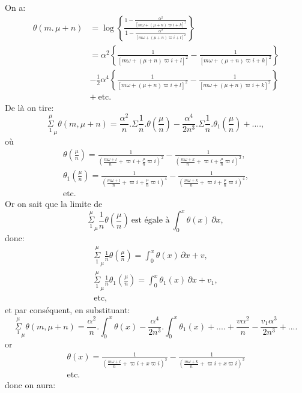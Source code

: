 \documentclass{article}
\begin{document}
On a:
\[ \begin{aligned}\theta(m.\,\mu+n)&=\log\left\{\frac{1-\frac{\alpha^{2}}{[m\omega+(\mu+n)\varpi i+k]^{2}}}{1-\frac{\alpha^{2}}{[m\omega+(\mu+n)\varpi i+l]^{2}}}\right\}\\ &=\alpha^{2}\left\{\frac{1}{[m\omega+(\mu+n)\varpi i+l]^{2}}-\frac{1}{[m\omega+(\mu+n)\varpi i+k]^{2}}\right\}\\ &-\tfrac{1}{2}\alpha^{4}\left\{\frac{1}{[m\omega+(\mu+n)\varpi i+l]^{2}}-\frac{1}{[m\omega+(\mu+n)\varpi i+k]^{2}}\right\}\\ &+\ \text{etc.}\end{aligned} \]
De là on tire:
\[ \overset{\mu}{\underset{1}{\Sigma}}_{\mu}\theta(m,\mu+n)=\frac{\alpha^{2}}{n}.\Sigma\frac{1}{n}.\theta\left(\frac{\mu}{n}\right)-\frac{\alpha^{4}}{2n^{3}}.\Sigma\frac{1}{n}.\theta_{1}\left(\frac{\mu}{n}\right)+...., \]
où
\[ \begin{gathered}\theta\left(\frac{\mu}{n}\right)=\frac{1}{\left(\frac{m\omega+l}{n}+\varpi i+\frac{\mu}{n}\varpi i\right)^{2}}-\frac{1}{\left(\frac{m\omega+k}{n}+\varpi i+\frac{\mu}{n}\varpi i\right)^{2}},\\ \theta_{1}\left(\frac{\mu}{n}\right)=\frac{1}{\left(\frac{m\omega+l}{n}+\varpi i+\frac{\mu}{n}\varpi i\right)^{4}}-\frac{1}{\left(\frac{m\omega+k}{n}+\varpi i+\frac{\mu}{n}\varpi i\right)^{4}},\\ \text{etc.}\end{gathered} \]
Or on sait que la limite de
\[ \overset{\mu}{\underset{1}{\Sigma}}_{\mu}\frac{1}{n}\theta\left(\frac{\mu}{n}\right)\ \text{est égale à}\ \int_{0}^{x}\theta(x)\,\partial x, \]
donc:
\[ \begin{gathered}\overset{\mu}{\underset{1}{\Sigma}}_{\mu}\frac{1}{n}\theta\left(\frac{\mu}{n}\right)=\int_{0}^{x}\theta(x)\,\partial x+v,\\ \overset{\mu}{\underset{1}{\Sigma}}_{\mu}\frac{1}{n}\theta_{1}\left(\frac{\mu}{n}\right)=\int_{0}^{x}\theta_{1}(x)\,\partial x+v_{1},\\ \text{etc},\end{gathered} \]
et par conséquent, en substituant:
\[ \overset{\mu}{\underset{1}{\Sigma}}_{\mu}\theta(m,\mu+n)=\frac{\alpha^{2}}{n}.\int_{0}^{x}\theta(x)-\frac{\alpha^{4}}{2n^{3}}.\int_{0}^{x}\theta_{1}(x)+....+\frac{v\alpha^{2}}{n}-\frac{v_{1}\alpha^{3}}{2n^{3}}+.... \]
or
\[ \begin{gathered}\theta(x)=\frac{1}{\left(\frac{m\omega+l}{n}+\varpi i+x\varpi i\right)^{2}}-\frac{1}{\left(\frac{m\omega+k}{n}+\varpi i+x\varpi i\right)^{2}}\\ \text{etc.}\end{gathered} \]
donc on aura:
\end{document}

